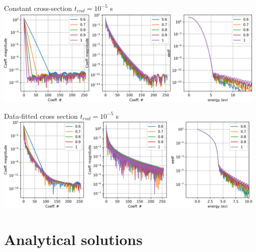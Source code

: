 \documentclass{article}[draft]
\begin{document}
Constant cross-section $t_{end} = 10^{-5}$ s\\
\includegraphics[width=0.99\textwidth]{fig/different_vth_const_1e-5.png}

Data-fitted cross section $t_{end} = 10^{-5}$ s\\
\includegraphics[width=0.99\textwidth]{fig/different_vth_real_1e-5.png}

\newpage
\section{Analytical solutions}
\end{document}
